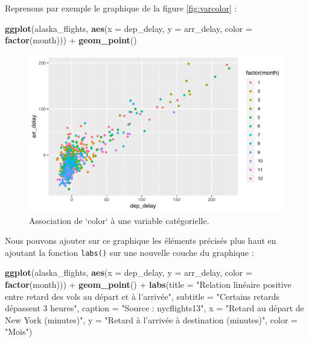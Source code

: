 \documentclass[a4paperpaper,]{article}
\newenvironment{Shaded}{\begin{snugshade}}{\end{snugshade}}
\newcommand{\DataTypeTok}[1]{\textcolor[rgb]{0.00,0.34,0.68}{#1}}
\newcommand{\KeywordTok}[1]{\textcolor[rgb]{0.12,0.11,0.11}{\textbf{#1}}}
\newcommand{\NormalTok}[1]{\textcolor[rgb]{0.12,0.11,0.11}{#1}}
\newcommand{\OperatorTok}[1]{\textcolor[rgb]{0.12,0.11,0.11}{#1}}
\newcommand{\StringTok}[1]{\textcolor[rgb]{0.75,0.01,0.01}{#1}}
\begin{document}
Reprenons par exemple le graphique de la figure \ref{fig:varcolor} :

\begin{Shaded}
\begin{Highlighting}[]
\KeywordTok{ggplot}\NormalTok{(alaska_flights, }
       \KeywordTok{aes}\NormalTok{(}\DataTypeTok{x =}\NormalTok{ dep_delay, }\DataTypeTok{y =}\NormalTok{ arr_delay, }\DataTypeTok{color =} \KeywordTok{factor}\NormalTok{(month))) }\OperatorTok{+}
\StringTok{  }\KeywordTok{geom_point}\NormalTok{()}
\end{Highlighting}
\end{Shaded}

\begin{figure}[htpb]

{\centering \includegraphics[width=0.9\linewidth]{figure/varcolorlabel-1} 

}

\caption{Association de `color` à une variable catégorielle.}\label{fig:varcolorlabel}
\end{figure}

Nous pouvons ajouter sur ce graphique les éléments précisés plus haut en ajoutant la fonction \texttt{labs()} sur une nouvelle couche du graphique :

\begin{Shaded}
\begin{Highlighting}[]
\KeywordTok{ggplot}\NormalTok{(alaska_flights, }
       \KeywordTok{aes}\NormalTok{(}\DataTypeTok{x =}\NormalTok{ dep_delay, }\DataTypeTok{y =}\NormalTok{ arr_delay, }\DataTypeTok{color =} \KeywordTok{factor}\NormalTok{(month))) }\OperatorTok{+}
\StringTok{  }\KeywordTok{geom_point}\NormalTok{() }\OperatorTok{+}
\StringTok{  }\KeywordTok{labs}\NormalTok{(}\DataTypeTok{title =} \StringTok{"Relation linéaire positive entre retard des vols au départ et à l'arrivée"}\NormalTok{,}
       \DataTypeTok{subtitle =} \StringTok{"Certains retards dépassent 3 heures"}\NormalTok{,}
       \DataTypeTok{caption =} \StringTok{"Source : nycflights13"}\NormalTok{,}
       \DataTypeTok{x =} \StringTok{"Retard au départ de New York (minutes)"}\NormalTok{,}
       \DataTypeTok{y =} \StringTok{"Retard à l'arrivée à destination (minutes)"}\NormalTok{,}
       \DataTypeTok{color =} \StringTok{"Mois"}\NormalTok{)}
\end{Highlighting}
\end{Shaded}
\end{document}
